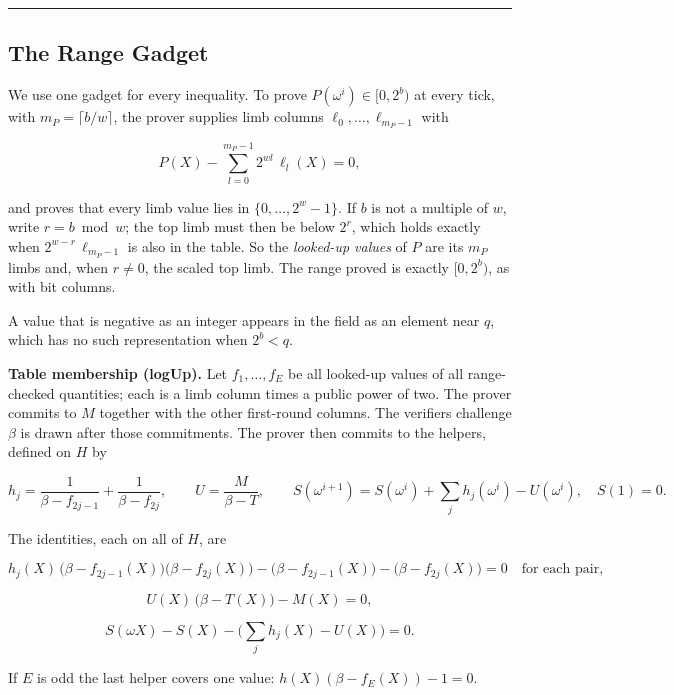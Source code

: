 \begin{center}\rule{0.5\linewidth}{0.5pt}\end{center}

\subsection{The Range Gadget}

We use one gadget for every inequality. To prove \(P(\omega^i) \in [0, 2^{b})\) at every tick, with \(m_P = \lceil b/w \rceil\), the prover supplies limb columns \(\ell_0, \ldots, \ell_{m_P-1}\) with

\[P(X) - \sum_{l=0}^{m_P-1} 2^{wl}\, \ell_l(X) = 0,\]

and proves that every limb value lies in \(\{0, \ldots, 2^w-1\}\). If \(b\) is not a multiple of \(w\), write \(r = b \bmod w\); the top limb must then be below \(2^r\), which holds exactly when \(2^{w-r}\,\ell_{m_P-1}\) is also in the table. So the \emph{looked-up values} of \(P\) are its \(m_P\) limbs and, when \(r \ne 0\), the scaled top limb. The range proved is exactly \([0, 2^b)\), as with bit columns.

A value that is negative as an integer appears in the field as an element near \(q\), which has no such representation when \(2^{b} < q\).

\textbf{Table membership (logUp).} Let \(f_1, \ldots, f_E\) be all looked-up values of all range-checked quantities; each is a limb column times a public power of two. The prover commits to \(M\) together with the other first-round columns. The verifier\textquotesingle s challenge \(\beta\) is drawn after those commitments. The prover then commits to the helpers, defined on \(H\) by

\[h_j = \frac{1}{\beta - f_{2j-1}} + \frac{1}{\beta - f_{2j}}, \qquad U = \frac{M}{\beta - T}, \qquad S(\omega^{i+1}) = S(\omega^{i}) + \sum_j h_j(\omega^i) - U(\omega^i), \quad S(1) = 0.\]

The identities, each on all of \(H\), are

\[h_j(X)\,\big(\beta - f_{2j-1}(X)\big)\big(\beta - f_{2j}(X)\big) - \big(\beta - f_{2j-1}(X)\big) - \big(\beta - f_{2j}(X)\big) = 0 \quad \text{for each pair},\]

\[U(X)\,\big(\beta - T(X)\big) - M(X) = 0,\]

\[S(\omega X) - S(X) - \Big(\sum_j h_j(X) - U(X)\Big) = 0.\]

If \(E\) is odd the last helper covers one value: \(h(X)(\beta - f_E(X)) - 1 = 0\).

